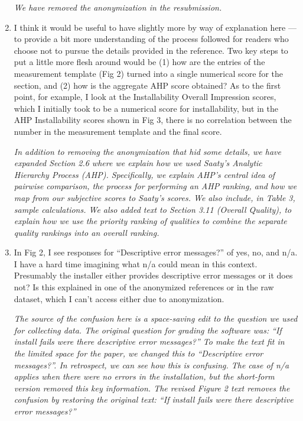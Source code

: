 \documentclass[12pt]{casletter}
\begin{document}
\begin{letter}
\begin{enumerate}
    \emph{We have removed the anonymization in the resubmission.  \smallskip}

  \item I think it would be useful to have slightly more by way of explanation
  here --- to provide a bit more understanding of the process followed for
  readers who choose not to pursue the details provided in the reference.  Two
  key steps to put a little more flesh around would be (1) how are the entries
  of the measurement template (Fig 2) turned into a single numerical score for
  the section, and (2) how is the aggregate AHP score obtained?  As to the first
  point, for example, I look at the Installability Overall Impression scores,
  which I initially took to be a numerical score for installability, but in the
  AHP Installability scores shown in Fig 3, there is no correlation between the
  number in the measurement template and the final score. \medskip

    \emph{In addition to removing the anonymization that hid some details, we have expanded Section 2.6 where we explain how we used Saaty's Analytic Hierarchy Process (AHP).  Specifically, we explain AHP's central idea of pairwise comparison, the process for performing an AHP ranking, and how we map from our subjective scores to Saaty's scores.  We also include, in Table 3, sample calculations. We also added text to Section 3.11 (Overall Quality), to explain how we use the priority ranking of qualities to combine the separate quality rankings into an overall ranking.\smallskip}

  \item In Fig 2, I see responses for ``Descriptive error messages?'' of yes, no,
  and n/a.  I have a hard time imagining what n/a could mean in this context.
  Presumably the installer either provides descriptive error messages or it does
  not?  Is this explained in one of the anonymized references or in the raw
  dataset, which I can't access either due to anonymization. \medskip

    \emph{The source of the confusion here is a space-saving edit to the question we used for collecting data.  The original question for grading the software was: ``If install fails were there descriptive error messages?'' To make the text fit in the limited space for the paper, we changed this to ``Descriptive error messages?''.   In retrospect, we can see how this is confusing.  The case of n/a applies when there were no errors in the installation, but the short-form version removed this key information.  The revised Figure 2 text removes the confusion by restoring the original text: ``If install fails were there descriptive error messages?''\smallskip}


\end{enumerate}
\end{letter}
\end{document}
